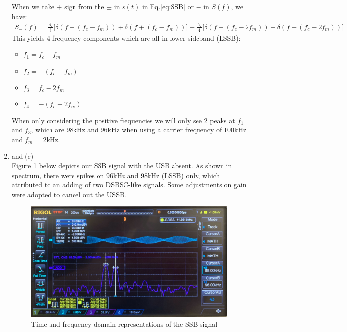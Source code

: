 \documentclass[11pt]{article}
\begin{document}
\begin{enumerate}[label=(\alph*)]
When we take $+$ sign from the $\pm$ in $s(t)$ in Eq.\ref{eq:SSB} or $-$ in $S(f)$, we have:
\begin{align*}
    S_{-}(f)= \frac{A_c}{8} \bigg[ \delta(f - (f_c - f_m)) + \delta(f + (f_c - f_m)) \bigg] + \frac{A_c}{4} \bigg[ \delta(f - (f_c - 2f_m)) + \delta(f + (f_c - 2f_m)) \bigg]
\end{align*}
This yields 4 frequency components which are all in lower sideband (LSSB):
\begin{multicols}{4}
\begin{itemize}
    \item $f_1=f_c-f_m$
    \item $f_2=-(f_c-f_m)$
    \item $f_3=f_c-2f_m$
    \item $f_4=-(f_c-2f_m)$
\end{itemize}
\end{multicols}
When only considering the positive frequencies we will only see 2 peaks at $f_1$ and $f_3$, which are 98kHz and 96kHz when using a carrier frequency of 100kHz and $f_m$ = 2kHz.


\item and (c)\\ %
Figure \ref{fig:W3Q1bc} below depicts our SSB signal with the USB absent. As shown in spectrum, there were spikes on 96kHz and 98kHz (LSSB) only, which attributed to an adding of two DSBSC-like signals. Some adjustments on gain were adopted to cancel out the USSB. 
\begin{figure}[H]
    \centering
    \includegraphics[width=15cm]{W3Q1bc.jpg}
    \caption{Time and frequency domain representations of the SSB signal}
    \label{fig:W3Q1bc}
\end{figure}
\end{enumerate}
\end{document}
